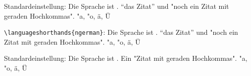 \documentclass[german]{article}
\begin{document}
%
\noindent
Standardeinstellung:\newline
Die Sprache ist \texttt{\languagename}. "`das Zitat"' und "noch ein Zitat mit geraden Hochkommas". "a, "o, \"a, \"U


\bigskip

\noindent
\verb!\languageshorthands{ngerman}!:\newline
Die Sprache ist \texttt{\languagename}. "`das Zitat"' und "noch ein Zitat mit geraden Hochkommas". "a, "o, \"a, \"U

\bigskip

\noindent%
Standardeinstellung:\newline
Die Sprache ist \texttt{\languagename}. Ein "Zitat mit geraden Hochkommas".
"a, "o, \"a, \"U
\end{document}
